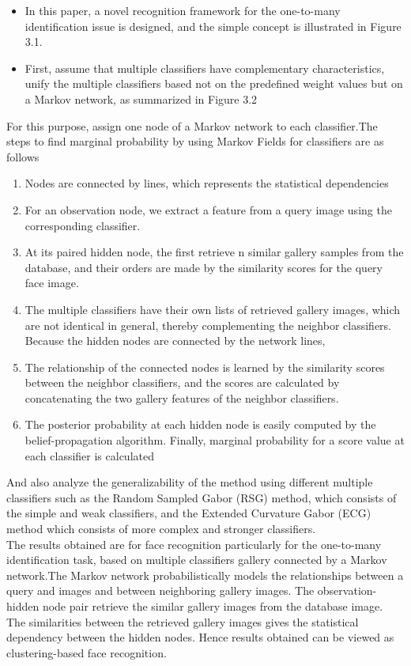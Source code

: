  \begin{itemize}
   \item In this paper, a novel recognition framework for the one-to-many identification issue is designed, and the simple concept is illustrated in Figure 3.1.
   \item First, assume that multiple classifiers have complementary characteristics, unify the multiple classifiers based not on the predefined weight values but on a Markov network, as summarized in Figure 3.2
 \end{itemize}

  For this purpose, assign one node of a Markov network to each classifier.The steps to find marginal probability by using Markov Fields for classifiers are as follows
  \begin{enumerate}
    \item Nodes are connected by lines, which represents the statistical dependencies
    \item For an observation node, we extract a feature from a query image using the corresponding classifier.
    \item At its paired hidden node,  the first retrieve n similar gallery samples from the database, and their orders are made by the similarity scores for the query face image.
  \item The multiple classifiers have their own lists of retrieved gallery images, which are not identical in general, thereby complementing the neighbor classifiers. Because the hidden nodes are connected by the network lines,
  \item The relationship of the connected nodes is learned by the similarity scores between the neighbor classifiers, and the scores are calculated by concatenating the two gallery features of the neighbor classifiers.
  \item The posterior probability at each hidden node is easily computed by the belief-propagation algorithm. Finally, marginal probability for a score value at each classifier is calculated
  \end{enumerate}
 And also analyze the generalizability of the method using different multiple classifiers such as the Random Sampled Gabor (RSG) method, which consists of the simple and weak classifiers, and the Extended Curvature Gabor (ECG) method which consists of more complex and stronger classifiers.
\\The results obtained are for face recognition particularly for the one-to-many identification task, based on multiple classifiers gallery connected by a Markov network.The Markov network probabilistically models the relationships between a query and images and between neighboring gallery images.
The observation-hidden node pair retrieve the  similar gallery images from the database image.
\\The similarities between the retrieved gallery images gives the statistical dependency between the hidden nodes. Hence results obtained can be viewed as clustering-based face recognition.





